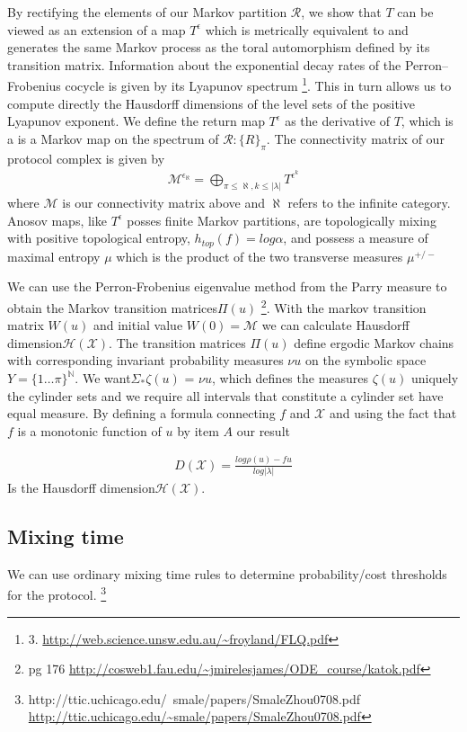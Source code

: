 \documentclass{article}
\begin{document}
By rectifying the elements of our Markov partition $\mathcal{R}$, we show that $T$ can be viewed as an extension of a map $T^{\epsilon}$ which is metrically equivalent to and generates the same Markov process as the toral automorphism defined by its transition matrix. Information about the exponential decay rates of the Perron–Frobenius cocycle is given by its Lyapunov spectrum \footnote{3. \url{http://web.science.unsw.edu.au/~froyland/FLQ.pdf}}. This in turn allows us to compute directly the Hausdorff dimensions of the level sets of the positive Lyapunov exponent. We define the return map $T^{\epsilon}$ as the derivative of $T$, which is a is a Markov map on the spectrum of $\mathcal{R}: \{R\}_\pi$. The connectivity matrix of our protocol complex is given by
\begin{equation} \label{eq1}
\begin{split}
\mathcal{M}^{\epsilon_\aleph} = \bigoplus_{\pi \leq \aleph, k\leq |\lambda|} T^{\epsilon^{k}}
\end{split}
\end{equation}
where $\mathcal{M}$ is our connectivity matrix above and $\aleph$ refers to the infinite category. Anosov maps, like $T^{\epsilon}$ posses finite Markov partitions, are topologically mixing with positive topological entropy, $h_{top}(f) = log \alpha$, and possess a measure of maximal entropy $\mu$ which is the product of the two transverse measures $\mu^{+/-}$

We can use the Perron-Frobenius eigenvalue method from the Parry measure to obtain the Markov transition matrices$\Pi(u)$ \footnote{ pg 176 \url{http://cosweb1.fau.edu/~jmirelesjames/ODE_course/katok.pdf}}. With the markov transition matrix $W(u)$ and initial value $W(0) = \mathcal{M}$ we can calculate Hausdorff dimension$\mathcal{H}(\mathcal{X})$. The transition matrices $\Pi(u)$ define ergodic Markov chains with corresponding invariant probability measures $\nu u$ on the symbolic space $Y = \{1 \dots \pi \}^{\mathbb{N}}$. We want$\Sigma_* \zeta(u)$ =  $\nu u$, which defines
the measures $\zeta(u)$ uniquely the cylinder sets and we require all intervals that constitute a cylinder set have equal measure. By defining a formula connecting $f$ and $\mathcal{X}$ and using the fact that $f$ is a monotonic function of $u$ by item $A$ our result

\begin{equation} \label{eq1}
\begin{split}
D(\mathcal{X}) = \frac{log \rho(u) - fu}{log |\lambda|}
\end{split}
\end{equation}
Is the Hausdorff dimension$\mathcal{H}(\mathcal{X})$. 
\subsection{Mixing time}
We can use ordinary mixing time rules to determine probability/cost thresholds for the protocol. \footnote{http://ttic.uchicago.edu/~smale/papers/SmaleZhou0708.pdf \url{http://ttic.uchicago.edu/~smale/papers/SmaleZhou0708.pdf}} 



\end{document}
